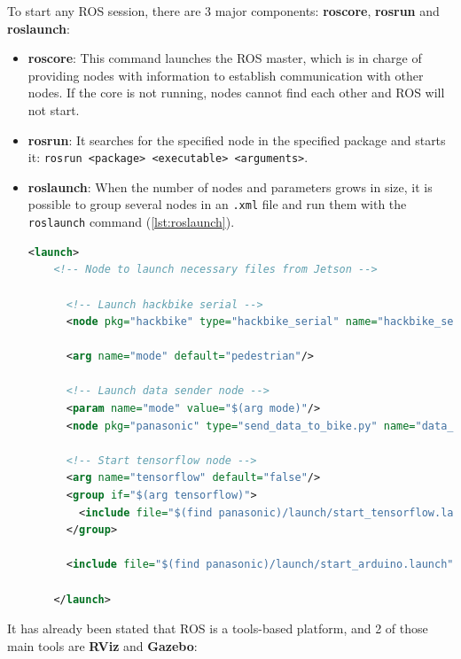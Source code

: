  To start any ROS session, there are 3 major components: \textbf{roscore}, \textbf{rosrun} and \textbf{roslaunch}:
\begin{itemize}
  \item \textbf{roscore}: This command launches the ROS master, which is in charge of providing nodes with information to establish communication with other nodes. If the core is not running, nodes cannot find each other and ROS will not start.

  \item \textbf{rosrun}: It searches for the specified node in the specified package and starts it: \texttt{rosrun <package> <executable> <arguments>}.

  \item \textbf{roslaunch}: When the number of nodes and parameters grows in size, it is possible to group several nodes in an \texttt{.xml} file and run them with the \texttt{roslaunch} command (\autoref{lst:roslaunch}). 
  \begin{lstlisting}[float=htb,language=xml,frame=htb,caption={Example of launch file},label=lst:roslaunch] 
    <launch>
    <!-- Node to launch necessary files from Jetson -->

      <!-- Launch hackbike serial -->
      <node pkg="hackbike" type="hackbike_serial" name="hackbike_serial_node" output="screen"/>

      <arg name="mode" default="pedestrian"/>

      <!-- Launch data sender node -->
      <param name="mode" value="$(arg mode)"/>
      <node pkg="panasonic" type="send_data_to_bike.py" name="data_sender_node" output="screen"/>

      <!-- Start tensorflow node -->
      <arg name="tensorflow" default="false"/>
      <group if="$(arg tensorflow)">
        <include file="$(find panasonic)/launch/start_tensorflow.launch"/>
      </group>

      <include file="$(find panasonic)/launch/start_arduino.launch"/>

    </launch>
  \end{lstlisting}
\end{itemize}  

 It has already been stated that ROS is a tools-based platform, and 2 of those main tools are \textbf{RViz} and \textbf{Gazebo}:

